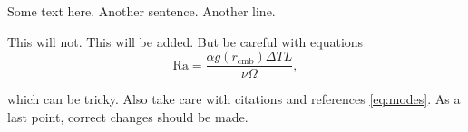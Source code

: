 Some text here. Another sentence.
Another line.

This will not. 
This will be added. But be careful with equations
\begin{equation}
    \text{Ra} = \frac{\alpha g(r_\text{cmb})\Delta T L}{\nu \Omega},
\end{equation}

which can be tricky. Also take care with citations \cite{einstein1905} and references \eqref{eq:modes}.
As a last point, correct changes should be made.
